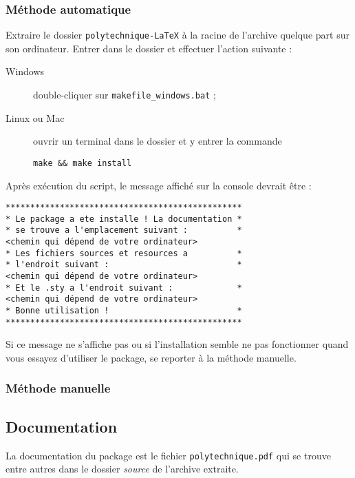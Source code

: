 \documentclass[a4paper,12pt,twoside]{article}
\begin{document}
\subsubsection{Méthode automatique}



Extraire le dossier \texttt{polytechnique-LaTeX} à la racine de l'archive quelque part sur son ordinateur. Entrer dans le dossier et effectuer l'action suivante :
\begin{description}
\item[Windows] double-cliquer sur \texttt{makefile\_windows.bat} ;
\item[Linux ou Mac] ouvrir un terminal dans le dossier et y entrer la commande
\begin{verbatim}
make && make install
\end{verbatim}
\end{description}
Après exécution du script, le message affiché sur la console devrait être :
\begin{verbatim}
************************************************
* Le package a ete installe ! La documentation *
* se trouve a l'emplacement suivant :          *
<chemin qui dépend de votre ordinateur>
* Les fichiers sources et resources a          *
* l'endroit suivant :                          *
<chemin qui dépend de votre ordinateur>
* Et le .sty a l'endroit suivant :             *
<chemin qui dépend de votre ordinateur>
* Bonne utilisation !                          *
************************************************
\end{verbatim}

Si ce message ne s'affiche pas ou si l'installation semble ne pas fonctionner quand vous essayez d'utiliser le package, se reporter à la méthode manuelle.
\subsubsection{Méthode manuelle}


\subsection{Documentation}

La documentation du package est le fichier \texttt{polytechnique.pdf} qui se trouve entre autres dans le dossier \emph{source} de l'archive extraite.
\end{document}
